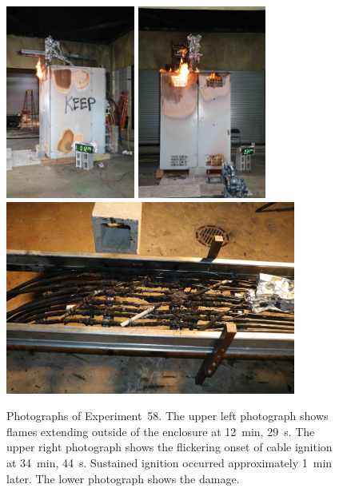 \begin{figure}[p]
\centering
\includegraphics[height=2.50in,angle=-90]{../FIGURES/Test_58_12_min_29_s}
\includegraphics[height=2.50in,angle=-90]{../FIGURES/Test_58_34_min_44_s} \\
\includegraphics[height=2.50in]{../FIGURES/Test_58_scar}
\caption[Photographs of Experiment~58]{Photographs of Experiment~58. The upper left photograph shows flames extending outside of the enclosure at 12~min, 29~s. The upper right photograph shows the flickering onset of cable ignition at 34~min, 44~s. Sustained ignition occurred approximately 1~min later. The lower photograph shows the damage.}
\label{fig:Test_58_photos}
\end{figure}


